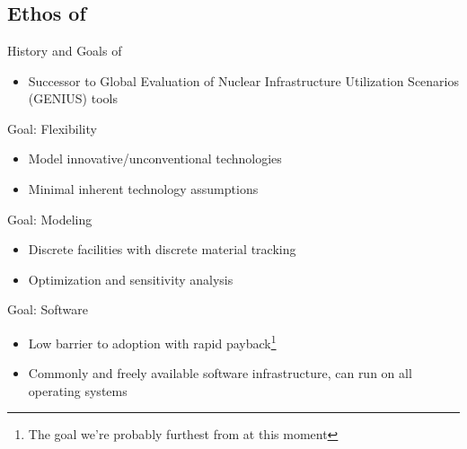 \section{\Cyclus}
\subsection{Ethos of \Cyclus}
\begin{frame}{History and Goals of \Cyclus}
\begin{itemize}
    \item Successor to Global Evaluation of Nuclear Infrastructure Utilization Scenarios (GENIUS) tools
\end{itemize}

\alert{Goal: Flexibility}

\begin{itemize}
    \item Model innovative/unconventional technologies
    \item Minimal inherent technology assumptions
\end{itemize}

\alert{Goal: Modeling}

\begin{itemize}
    \item Discrete facilities with discrete material tracking
    \item Optimization and sensitivity analysis
\end{itemize}

\alert{Goal: Software}


\begin{itemize}
    \item Low barrier to adoption with rapid payback\footnote{The goal we're probably furthest from at this moment}
    \item Commonly and freely available software infrastructure, can run on all operating systems
\end{itemize}
\end{frame}



